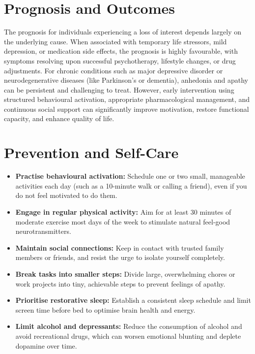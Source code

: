 \section*{Prognosis and Outcomes}
The prognosis for individuals experiencing a loss of interest depends largely on the underlying cause. When associated with temporary life stressors, mild depression, or medication side effects, the prognosis is highly favourable, with symptoms resolving upon successful psychotherapy, lifestyle changes, or drug adjustments. For chronic conditions such as major depressive disorder or neurodegenerative diseases (like Parkinson's or dementia), anhedonia and apathy can be persistent and challenging to treat. However, early intervention using structured behavioural activation, appropriate pharmacological management, and continuous social support can significantly improve motivation, restore functional capacity, and enhance quality of life.

\section*{Prevention and Self-Care}
\begin{itemize}
    \item \textbf{Practise behavioural activation:} Schedule one or two small, manageable activities each day (such as a 10-minute walk or calling a friend), even if you do not feel motivated to do them.
    \item \textbf{Engage in regular physical activity:} Aim for at least 30 minutes of moderate exercise most days of the week to stimulate natural feel-good neurotransmitters.
    \item \textbf{Maintain social connections:} Keep in contact with trusted family members or friends, and resist the urge to isolate yourself completely.
    \item \textbf{Break tasks into smaller steps:} Divide large, overwhelming chores or work projects into tiny, achievable steps to prevent feelings of apathy.
    \item \textbf{Prioritise restorative sleep:} Establish a consistent sleep schedule and limit screen time before bed to optimise brain health and energy.
    \item \textbf{Limit alcohol and depressants:} Reduce the consumption of alcohol and avoid recreational drugs, which can worsen emotional blunting and deplete dopamine over time.
\end{itemize}

